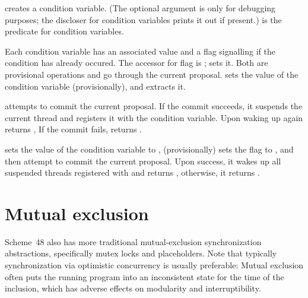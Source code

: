 \begin{protos}
\end{protos}
%
 creates a condition variable.  (The optional
 argument is only for debugging purposes; the discloser for
condition variables prints it out if present.)   is the
predicate for condition variables.

Each condition variable has an associated value and a flag
 signalling if the condition has already occured.
The accessor for flag is ;
 sets it.  Both are provisional
operations and go through the current proposal.
 sets the value of the condition variable
(provisionally), and  extracts it.

 attempts to commit the
current proposal.  If the commit succeeds, it suspends the current
thread and registers it with the  condition variable.
Upon waking up again  returns
, If the commit fails, 
returns .

 sets the value of the
 condition variable to , (provisionally)
sets the  flag to , and then attempt to
commit the current proposal.  Upon success, it wakes up all suspended
threads registered with  and returns ,
otherwise, it returns .

\section{Mutual exclusion}

Scheme~48 also has more traditional mutual-exclusion synchronization
abstractions, specifically mutex locks and placeholders.  Note that
typically synchronization via optimistic concurrency is usually
preferable: Mutual exclusion often puts the running program into an
inconsistent state for the time of the inclusion, which has adverse
effects on modularity and interruptibility.

